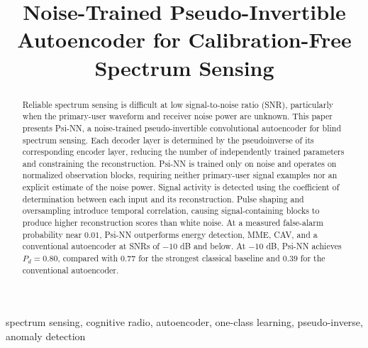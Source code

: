 \documentclass[conference]{IEEEtran}
\begin{document}
\title{Noise-Trained Pseudo-Invertible Autoencoder for Calibration-Free Spectrum Sensing\\
}

\author{
\and
{}

}
\maketitle

\begin{abstract}
Reliable spectrum sensing is difficult at low signal-to-noise ratio
(SNR), particularly when the primary-user waveform and receiver noise
power are unknown. This paper presents Psi-NN, a noise-trained
pseudo-invertible convolutional autoencoder for blind spectrum sensing.
Each decoder layer is determined by the pseudoinverse of its
corresponding encoder layer, reducing the number of independently
trained parameters and constraining the reconstruction. Psi-NN is
trained only on noise and operates on normalized observation blocks,
requiring neither primary-user signal examples nor an explicit estimate
of the noise power. Signal activity is detected using the coefficient
of determination between each input and its reconstruction. Pulse
shaping and oversampling introduce temporal correlation, causing
signal-containing blocks to produce higher reconstruction scores than
white noise. At a measured false-alarm probability near $0.01$, Psi-NN
outperforms energy detection, MME, CAV, and a conventional autoencoder
at SNRs of $-10$ dB and below. At $-10$ dB, Psi-NN achieves
$P_d=0.80$, compared with $0.77$ for the strongest classical baseline
and $0.39$ for the conventional autoencoder.
\end{abstract}

\begin{IEEEkeywords}
spectrum sensing, cognitive radio, autoencoder, one-class learning,
pseudo-inverse, anomaly detection
\end{IEEEkeywords}
\end{document}
